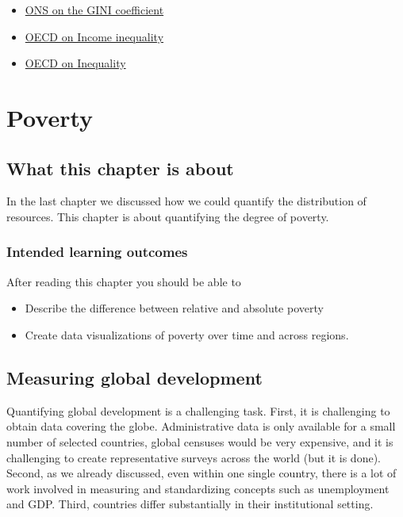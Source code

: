 \documentclass[
]{book}
\providecommand{\tightlist}{%
  \setlength{\itemsep}{0pt}\setlength{\parskip}{0pt}}
\begin{document}
\begin{itemize}
\item
  \href{https://www.ons.gov.uk/peoplepopulationandcommunity/birthsdeathsandmarriages/families/methodologies/theginicoefficient}{ONS on the GINI coefficient}
\item
  \href{https://data.oecd.org/inequality/income-inequality.htm}{OECD on Income inequality}
\item
  \href{http://www.oecd.org/social/inequality.htm}{OECD on Inequality}
\end{itemize}

\hypertarget{poverty}{%
\chapter{Poverty}\label{poverty}}

\hypertarget{what-this-chapter-is-about-3}{%
\section{What this chapter is about}\label{what-this-chapter-is-about-3}}

In the last chapter we discussed how we could quantify the distribution of resources. This chapter is about quantifying the degree of poverty.

\hypertarget{intended-learning-outcomes-3}{%
\subsection*{Intended learning outcomes}\label{intended-learning-outcomes-3}}

After reading this chapter you should be able to

\begin{itemize}
\tightlist
\item
  Describe the difference between relative and absolute poverty
\item
  Create data visualizations of poverty over time and across regions.
\end{itemize}

\hypertarget{measuring-global-development}{%
\section{Measuring global development}\label{measuring-global-development}}

Quantifying global development is a challenging task. First, it is challenging to obtain data covering the globe. Administrative data is only
available for a small number of selected countries, global censuses would be very expensive, and it is challenging to create representative surveys across the world (but it is done). Second, as we already discussed, even within one single country, there is a lot of work involved in measuring and standardizing concepts such as unemployment and GDP. Third, countries differ substantially in their institutional setting.
\end{document}
